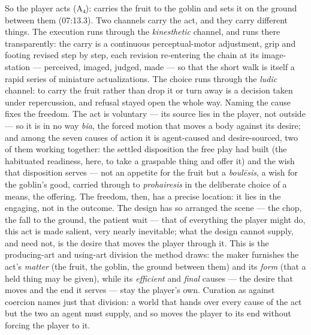 \documentclass{article}
\begin{document}
So the player acts (A₄): carries the fruit to the goblin and sets it on the ground between them (07:13.3). Two channels carry the act, and they carry different things. The execution runs through the \textit{kinesthetic} channel, and runs there transparently: the carry is a continuous perceptual-motor adjustment, grip and footing revised step by step, each revision re-entering the chain at its image-station — perceived, imaged, judged, made — so that the short walk is itself a rapid series of miniature actualizations. The choice runs through the \textit{ludic} channel: to carry the fruit rather than drop it or turn away is a decision taken under repercussion, and refusal stayed open the whole way. Naming the cause fixes the freedom. The act is voluntary — its source lies in the player, not outside — so it is in no way \textit{bia}, the forced motion that moves a body against its desire; and among the seven causes of action it is agent-caused and desire-sourced, two of them working together: the settled disposition the free play had built (the habituated readiness, here, to take a graspable thing and offer it) and the wish that disposition serves — not an appetite for the fruit but a \textit{boulēsis}, a wish for the goblin's good, carried through to \textit{prohairesis} in the deliberate choice of a means, the offering. The freedom, then, has a precise location: it lies in the engaging, not in the outcome. The design has so arranged the scene — the chop, the fall to the ground, the patient wait — that of everything the player might do, this act is made salient, very nearly inevitable; what the design cannot supply, and need not, is the desire that moves the player through it. This is the producing-art and using-art division the method draws: the maker furnishes the act's \textit{matter} (the fruit, the goblin, the ground between them) and its \textit{form} (that a held thing may be given), while its \textit{efficient} and \textit{final} causes — the desire that moves and the end it serves — stay the player's own. Curation as against coercion names just that division: a world that hands over every cause of the act but the two an agent must supply, and so moves the player to its end without forcing the player to it.
\end{document}
